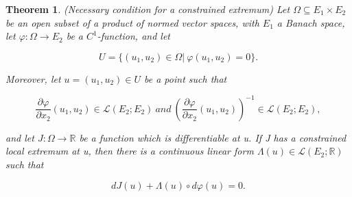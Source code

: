 \documentclass[a4paper,12pt]{report}
\newtheorem{theorem}{Theorem}[section]
\begin{document}
\begin{theorem}
    (Necessary condition for a constrained extremum\cite{gallier2019algebra}) Let $\Omega\subseteq E_1 \times E_2$ be an open subset of a product of normed vector spaces, with $E_1$ a Banach space, let $\varphi: \Omega\to E_2$ be a $C^1$-function, and let

    \[
        U=\{(u_1,u_2)\in \Omega |\ \varphi (u_1, u_2)=0\}.
    \]

    Moreover, let $u=(u_1,u_2)\in U$ be a point such that

    \[
        \frac{\partial \varphi}{\partial x_2}(u_1,u_2)\in \mathcal L (E_2;E_2)\ and\ \left(\frac{\partial \varphi}{\partial x_2}(u_1,u_2)\right)^{-1}\in \mathcal L (E_2;E_2),
    \]

    and let $J : \Omega \to \mathbb R $ be a function which is differentiable at u. If J has a constrained local extremum at u, then there is a continuous linear form $\Lambda(u)\in\mathcal L (E_2;\mathbb R)$ such that

    \[
        dJ(u)+\Lambda(u)\circ d\varphi(u)=0.
    \]

\end{theorem}
\end{document}
